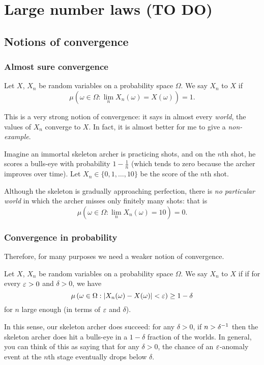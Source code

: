 \chapter{Large number laws (TO DO)}
\section{Notions of convergence}
\subsection{Almost sure convergence}
\begin{definition}
	Let $X$, $X_n$ be random variables on a probability space $\Omega$.
	We say $X_n$  to $X$ if
	\[ \mu \left( \omega \in \Omega :
		\lim_n X_n(\omega) = X(\omega) \right) = 1. \]
\end{definition}
This is a very strong notion of convergence:
it says in almost every \emph{world},
the values of $X_n$ converge to $X$.
In fact, it is almost better for me to give a \emph{non-example}.
\begin{example}
	Imagine an immortal skeleton archer is practicing shots,
	and on the $n$th shot, he scores a bulls-eye with probability
	$1 - \frac 1n$
	(which tends to zero because the archer improves over time).
	Let $X_n \in \{0, 1, \dots, 10\}$ be the score of the $n$th shot.

	Although the skeleton is gradually approaching perfection,
	there is \emph{no particular world} in which the archer
	misses only finitely many shots: that is
	\[ \mu \left( \omega \in \Omega :
		\lim_n X_n(\omega) = 10 \right) = 0. \]
\end{example}

\subsection{Convergence in probability}
Therefore, for many purposes we need a weaker notion of convergence.
\begin{definition}
	Let $X$, $X_n$ be random variables on a probability space $\Omega$.
	We say $X_n$  to $X$ if
	if for every $\varepsilon > 0$ and $\delta > 0$, we have
	\[ \mu \left( \omega \in \Omega :
			\left\lvert X_n(\omega) - X(\omega) \right\rvert < \varepsilon
		\right) \ge 1 - \delta  \]
	for $n$ large enough (in terms of $\varepsilon$ and $\delta$).
\end{definition}
In this sense, our skeleton archer does succeed:
for any $\delta > 0$, if $n > \delta^{-1}$
then the skeleton archer does hit a bulls-eye
in a $1-\delta$ fraction of the worlds.
In general, you can think of this as saying that for any $\delta > 0$,
the chance of an $\varepsilon$-anomaly event at the $n$th stage
eventually drops below $\delta$.

